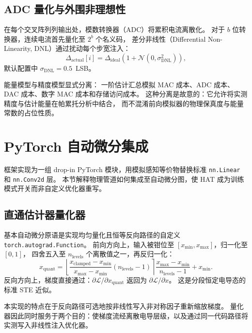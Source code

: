 \subsection{ADC 量化与外围非理想性}

在每个交叉阵列列输出处，模数转换器（ADC）将累积电流离散化。
对于 $b$ 位转换器，连续电流首先量化至 $2^b$ 个名义码，
差分非线性（Differential Non-Linearity, DNL）通过扰动每个步宽注入：
\begin{equation}
\Delta_{\text{actual}}[i] = \Delta_{\text{ideal}} \left(1 + \mathcal{N}(0, \sigma_{\text{DNL}}^2)\right),
\label{eq:dnl}
\end{equation}
默认配置中 $\sigma_{\text{DNL}} = 0.5$~LSB。

能量模型与精度模型显式分离：
一阶估计汇总模拟 MAC 成本、ADC 成本、DAC 成本、数字 MAC 成本和存储访问成本。
这种分离是故意的：它允许将实测精度与估计能量在帕累托分析中结合，
而不混淆前向模拟器的物理保真度与能量常数的占位性质。

\section{PyTorch 自动微分集成}
\label{sec:pytorch-integration}

框架实现为一组 drop-in PyTorch 模块，用模拟感知等价物替换标准 \texttt{nn.Linear} 和 \texttt{nn.Conv2d} 层。
本节解释物理管道如何集成至自动微分图，使 HAT 成为训练模式开关而非自定义优化器重写。

\subsection{直通估计器量化器}

基本自动微分原语是实现均匀量化且恒等反向路径的自定义 \texttt{torch.autograd.Function}。
前向方向上，输入被钳位至 $[x_{\min}, x_{\max}]$，归一化至 $[0,1]$，
四舍五入至 $n_{\text{levels}}$ 个离散值之一，再反归一化：
\begin{equation}
x_{\text{quant}} = \left\lfloor \frac{x_{\text{clamped}} - x_{\min}}{x_{\max} - x_{\min}} (n_{\text{levels}} - 1) \right\rceil \frac{x_{\max} - x_{\min}}{n_{\text{levels}} - 1} + x_{\min}.
\label{eq:ste-forward}
\end{equation}
反向方向上，梯度直接通过：$\partial \mathcal{L} / \partial x_{\text{quant}}$ 返回为 $\partial \mathcal{L} / \partial x$。
这是分段恒定电导态的标准 STE 近似。

本实现的特点在于反向路径可选地按非线性写入非对称因子重新缩放梯度。
量化器因此同时服务于两个目的：使梯度流经离散电导层级，以及通过同一代码路径将实测写入非线性注入优化器。

